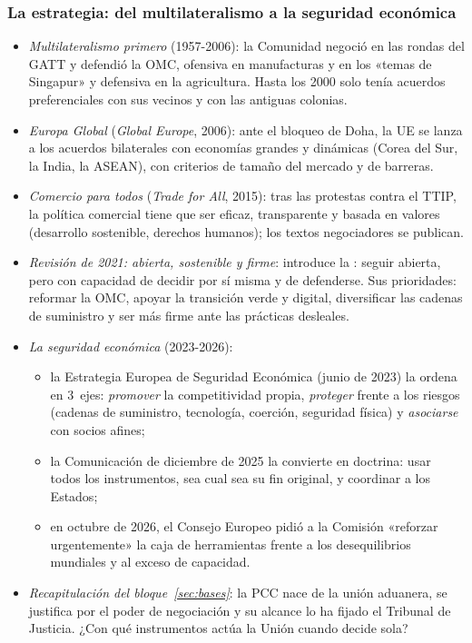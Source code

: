 \documentclass[11pt]{article}
\begin{document}
\subsubsection{La estrategia: del multilateralismo a la seguridad económica}\label{sec:estrategia-etapas}
\begin{itemize}
\item \emph{Multilateralismo primero} (1957-2006): la Comunidad negoció en las rondas del GATT y defendió la OMC, ofensiva en manufacturas y en los «temas de Singapur» y defensiva en la agricultura. Hasta los 2000 solo tenía acuerdos preferenciales con sus vecinos y con las antiguas colonias.
\item \emph{Europa Global} (\emph{Global Europe}, 2006): ante el bloqueo de Doha, la UE se lanza a los acuerdos bilaterales con economías grandes y dinámicas (Corea del Sur, la India, la ASEAN), con criterios de tamaño del mercado y de barreras.
\item \emph{Comercio para todos} (\emph{Trade for All}, 2015)\nocite{CE2015TradeForAll}: tras las protestas contra el TTIP, la política comercial tiene que ser eficaz, transparente y basada en valores (desarrollo sostenible, derechos humanos); los textos negociadores se publican.
\item \emph{Revisión de 2021: abierta, sostenible y firme}\nocite{CE2021TradePolicyReview}: introduce la : seguir abierta, pero con capacidad de decidir por sí misma y de defenderse. Sus prioridades: reformar la OMC, apoyar la transición verde y digital, diversificar las cadenas de suministro y ser más firme ante las prácticas desleales.
\item \emph{La seguridad económica} (2023-2026):
  \begin{itemize}
  \item la Estrategia Europea de Seguridad Económica (junio de 2023)\nocite{CE2023SeguridadEconomica} la ordena en 3~ejes: \emph{promover} la competitividad propia, \emph{proteger} frente a los riesgos (cadenas de suministro, tecnología, coerción, seguridad física) y \emph{asociarse} con socios afines;
  \item la Comunicación de diciembre de 2025\nocite{CE2025SeguridadEconomica} la convierte en doctrina: usar todos los instrumentos, sea cual sea su fin original, y coordinar a los Estados;
  \item en octubre de 2026, el Consejo Europeo pidió a la Comisión «reforzar urgentemente» la caja de herramientas frente a los desequilibrios mundiales y al exceso de capacidad\nocite{CEU2026ConclusionesOctubre}.
  \end{itemize}
\item \emph{Recapitulación del bloque~\ref{sec:bases}}: la PCC nace de la unión aduanera, se justifica por el poder de negociación y su alcance lo ha fijado el Tribunal de Justicia. ¿Con qué instrumentos actúa la Unión cuando decide sola?
\end{itemize}
\end{document}
